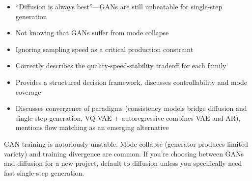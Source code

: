 \begin{interviewq}
\redflags
\begin{itemize}
    \item ``Diffusion is always best''---GANs are still unbeatable for single-step generation
    \item Not knowing that GANs suffer from mode collapse
    \item Ignoring sampling speed as a critical production constraint
\end{itemize}


\goodgreat
\begin{itemize}
    \item {} Correctly describes the quality-speed-stability tradeoff for each family
    \item {} Provides a structured decision framework, discusses controllability and mode coverage
    \item {} Discusses convergence of paradigms (consistency models bridge diffusion and single-step generation, VQ-VAE + autoregressive combines VAE and AR), mentions flow matching as an emerging alternative
\end{itemize}

\end{interviewq}

\begin{warningbox}
GAN training is notoriously unstable. Mode collapse (generator produces limited variety) and training divergence are common. If you're choosing between GANs and diffusion for a new project, default to diffusion unless you specifically need fast single-step generation.
\end{warningbox}

